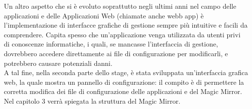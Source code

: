 Un altro aspetto che si \`e evoluto soprattutto negli ultimi anni nel campo
delle applicazioni e delle Applicazioni Web (chiamate anche webb app)
\`e l'implementazione di interfacce grafiche di gestione sempre pi\`u
intuitive e facili da comprendere. Capita spesso che un'applicazione
venga utilizzata da utenti privi di conoscenze informatiche, i quali, se mancasse
l'interfaccia di gestione, dovrebbero accedere direttamente ai file di configurazione
per modificarli, e potrebbero causare potenziali danni.\\
A tal fine, nella seconda parte dello stage,
\`e stata sviluppata un'interfaccia grafica web, la quale mostra un pannello di configurazione:
il compito \`e di permettere la corretta modifica dei file di configurazione delle applicazioni
e del Magic Mirror.
\\[2\baselineskip]
Nel capitolo 3 verr\`a spiegata la struttura del Magic Mirror.
